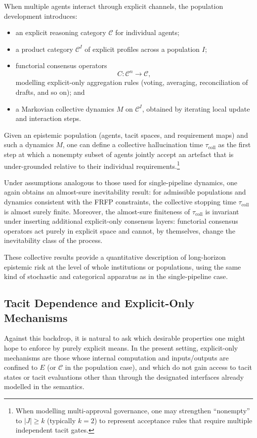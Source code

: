 When multiple agents interact through explicit channels, the population development introduces:
\begin{itemize}
  \item an explicit reasoning category $\mathcal{C}$ for individual agents;
  \item a product category $\mathcal{C}^I$ of explicit profiles across a population $I$;
  \item functorial consensus operators
    \[
      C : \mathcal{C}^n \longrightarrow \mathcal{C},
    \]
    modelling explicit-only aggregation rules (voting, averaging, reconciliation of drafts, and so on); and
  \item a Markovian collective dynamics $M$ on $\mathcal{C}^I$, obtained by iterating local update and interaction steps.
\end{itemize}
Given an epistemic population (agents, tacit spaces, and requirement maps) and such a dynamics $M$, one can define a collective hallucination time $\tau_{\mathrm{coll}}$ as the first step at which a nonempty subset of agents jointly accept an artefact that is under-grounded relative to their individual requirements.\footnote{When modelling multi-approval governance, one may strengthen ``nonempty'' to $|J|\ge k$ (typically $k=2$) to represent acceptance rules that require multiple independent tacit gates.}

Under assumptions analogous to those used for single-pipeline dynamics, one again obtains an almost-sure inevitability result: for admissible populations and dynamics consistent with the FRFP constraints, the collective stopping time $\tau_{\mathrm{coll}}$ is almost surely finite. Moreover, the almost-sure finiteness of $\tau_{\mathrm{coll}}$ is invariant under inserting additional explicit-only consensus layers: functorial consensus operators act purely in explicit space and cannot, by themselves, change the inevitability class of the process.

These collective results provide a quantitative description of long-horizon epistemic risk at the level of whole institutions or populations, using the same kind of stochastic and categorical apparatus as in the single-pipeline case.

\subsection{Tacit Dependence and Explicit-Only Mechanisms}

Against this backdrop, it is natural to ask which desirable properties one might hope to enforce by purely explicit means. In the present setting, explicit-only mechanisms are those whose internal computation and inputs/outputs are confined to $E$ (or $\mathcal{C}$ in the population case), and which do not gain access to tacit states or tacit evaluations other than through the designated interfaces already modelled in the semantics.

